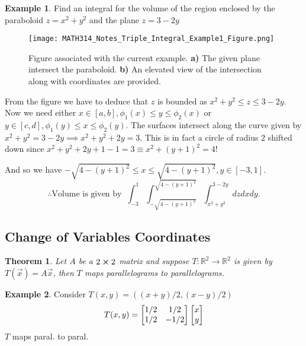 \documentclass[
	12pt,
	]{article}
\newcommand{\R}{\mathbb{R}}
\theoremstyle{custom}
\newtheorem{theorem}{Theorem}[section]
\theoremstyle{custom}
\theoremstyle{custom}
\theoremstyle{custom}
\theoremstyle{custom}
\theoremstyle{definition}
\newtheorem{example}{Example}[section]
\theoremstyle{example}
\theoremstyle{note}
\theoremstyle{remark}
\theoremstyle{example}
\newcounter{theo}[section]\setcounter{theo}{0}
\numberwithin{equation}{subsection}
\begin{document}
  			\begin{example}
  				Find an integral for the volume of the region enclosed by the paraboloid \newline  $z=x^{2} + y^{2}$ and the plane $z= 3- 2y$
  				\begin{figure}[H]
  					\centering
  					\texttt{[image: MATH314\_Notes\_Triple\_Integral\_Example1\_Figure.png]}
  					\captionsetup{margin=1cm, justification=raggedright}\caption{Figure associated with the current example. \textbf{a)} The given plane intersect the paraboloid. \textbf{b)} An elevated view of the intersection along with coordinates are provided.}
  				\end{figure}
  				\noindent From the figure we have to deduce that $z$ is bounded as $x^{2}+y^{2} \le z \le 3-2y$. Now we need either $x\in [a,b] , \phi_{1}(x)\le y \le \phi_{2}(x)$ or $y \in [c,d] , \phi_{1}(y) \le x \le \phi_{2}(y)$. 
  				The surfaces intersect along the curve given by $x^{2}+y^{2} = 3-2y \implies x^{2} + y^{2} + 2y =3. $ This is in fact a circle of radius $2$ shifted down since $x^{2} + y^{2} + 2y +1 -1 = 3 \equiv x^{2} + (y+1)^{2} =4 ! $
  				
  				\noindent And so we have $-\sqrt{4-(y+1)^{2}} \le x \le \sqrt{4-(y+1)^{2}} , y\in [-3,1]$.
  				$$ \therefore \text{Volume is given by } \ \int_{-3}^{1} \int_{-\sqrt{4-(y+1)^{2}}}^{\sqrt{4-(y+1)^{2}}}\int_{x^{2}+y^{2}}^{3-2y} dzdxdy.$$
  			\end{example}
  			
  			\subsection{Change of Variables Coordinates}
  			
  			\begin{theorem}
  				Let $A$ be a $2\cross 2$ matrix and suppose $T: \R^{2} \to \R^{2}$ is given by $T(\vec{x}) = A \vec{x}$, then $T$ maps parallelograms to parallelograms.
  			\end{theorem}
  			
  			\begin{example}
  				Consider $T(x,y) = ((x+y)/2 , (x-y)/2)$
  				$$ T(x,y) = 
  				\begin{bmatrix}
  					1/2 & 1/2 \\
  					1/2 & -1/2 
  				\end{bmatrix}
  				\begin{bmatrix}
  					\vphantom{1/2}	x \\
  					\vphantom{1/2}y
  				\end{bmatrix}$$
  				$T$ maps paral. to paral.
  			\end{example}
  			
\end{document}
